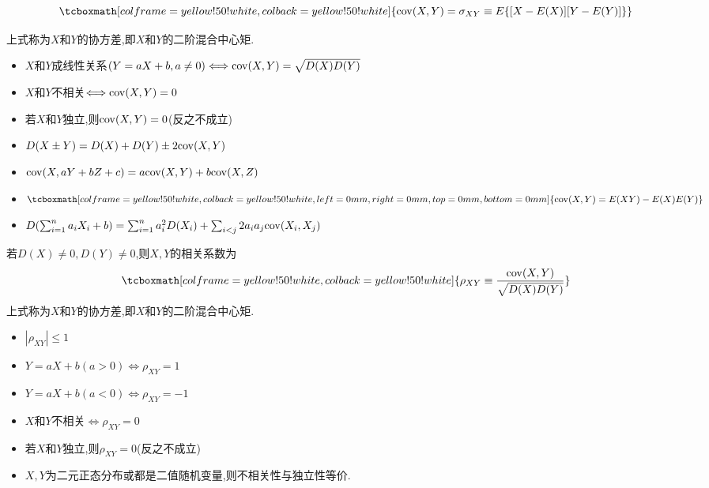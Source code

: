 \documentclass[UTF8]{ctexart}
\newcommand\stressarea{\tcboxmath[colframe=yellow!50!white,colback=yellow!50!white]}
\newcommand\stress{\tcboxmath[colframe=yellow!50!white,colback=yellow!50!white,left=0mm,right=0mm,top=0mm,bottom=0mm]}
\newenvironment{itemizer}{\begin{itemize}}{\end{itemize}}
\newenvironment{itemizeg}{\begin{itemize}}{\end{itemize}}
\begin{document}
\begin{tcolorbox}[colframe=green!66!black,title={\subsubsection{协方差}}]
    $$\stressarea{{\rm cov}(X,Y)=\sigma_{XY}\equiv E\{[X-E(X)][Y-E(Y)]\}}$$
    
    \noindent 上式称为$X$和$Y$的协方差,即$X$和$Y$的二阶混合中心矩.
    \begin{itemizeg}
        \item $X$和$Y$成线性关系$(Y=aX+b,a\not=0)\Longleftrightarrow{\rm cov}(X,Y)=\sqrt{D(X)D(Y)}$
        \item $X$和$Y$不相关$\Longleftrightarrow{\rm cov}(X,Y)=0$
        \item 若$X$和$Y$独立,则${\rm cov}(X,Y)=0$(反之不成立)
        \item $D(X\pm Y)=D(X)+D(Y)\pm2{\rm cov}(X,Y)$
    \end{itemizeg}        
    \begin{itemizer}
        \item ${\rm cov}(X,aY+bZ+c)=a{\rm cov}(X,Y)+b{\rm cov}(X,Z)$
        \item $\stress{{\rm cov}(X,Y)=E(XY)-E(X)E(Y)}$
        \item $D(\sum_{i=1}^na_iX_i+b)=\sum_{i=1}^na_i^2D(X_i)+\sum_{i<j}2a_ia_j{\rm cov}(X_i,X_j)$
    \end{itemizer}
\end{tcolorbox}

\begin{tcolorbox}[colframe=green!66!black,title={\subsubsection{相关系数}}]
    \noindent 若$D(X)\not=0,D(Y)\not=0$,则$X,Y$的相关系数为
    $$\stressarea{\rho_{XY}\equiv\frac{{\rm cov}(X,Y)}{\sqrt{D(X)D(Y)}}}$$    
    \noindent 上式称为$X$和$Y$的协方差,即$X$和$Y$的二阶混合中心矩.
    \begin{itemizeg}
        \item $|\rho_{XY}|\leq 1$
        \item $Y=aX+b(a>0)\Longleftrightarrow\rho_{XY}=1$
        \item $Y=aX+b(a<0)\Longleftrightarrow\rho_{XY}=-1$
        \item $X$和$Y$不相关$\Longleftrightarrow\rho_{XY}=0$
        \item 若$X$和$Y$独立,则$\rho_{XY}=0$(反之不成立)
    \end{itemizeg}
    \begin{itemizer}
        \item $X,Y$为二元正态分布或都是二值随机变量,则不相关性与独立性等价.
    \end{itemizer}
\end{tcolorbox}
\end{document}
